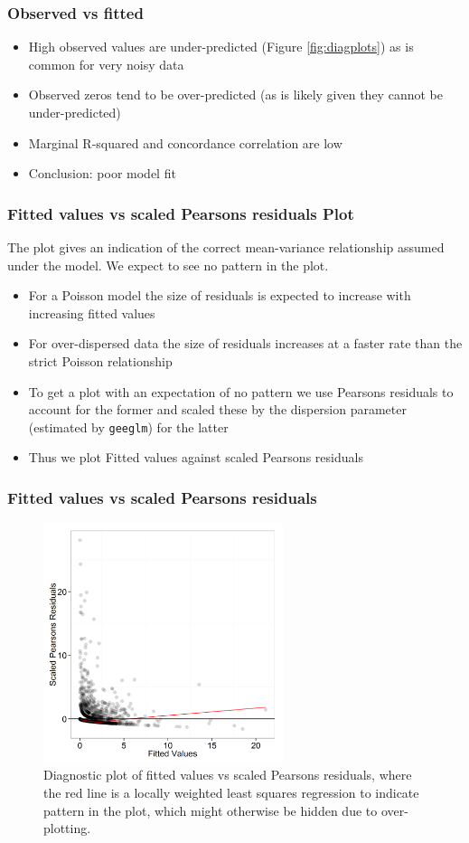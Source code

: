 \begin{frame}
\frametitle{Observed vs fitted}
\begin{itemize}
\item High observed values are under-predicted (Figure \ref{fig:diagplots}) as is common for very noisy data
\item Observed zeros tend to be over-predicted (as is likely given they cannot be under-predicted)
\item Marginal R-squared and concordance correlation are low
\pause
\bigskip
\item Conclusion: poor model fit
\end{itemize}
\end{frame}


\begin{frame}[fragile]
\frametitle{Fitted values vs scaled Pearsons residuals Plot}
The plot gives an indication of the correct mean-variance relationship assumed under the model.  We expect to see no pattern in the plot.  

\begin{itemize}
\item For a Poisson model the size of residuals is expected to increase with increasing fitted values
\item For over-dispersed data the size of residuals increases at a faster rate than the strict Poisson relationship
\item To get a plot with an expectation of no pattern we use Pearsons residuals to account for the former and scaled these by the dispersion parameter (estimated by {\tt geeglm}) for the latter
\item Thus we plot Fitted values against scaled Pearsons residuals
\end{itemize}
\end{frame}

\begin{frame}[fragile]
\frametitle{Fitted values vs scaled Pearsons residuals}
\begin{figure}[h]
  \centering
    \includegraphics[width=7cm]{danish/FitPlots_resids.png}
  \caption{Diagnostic plot of fitted values vs scaled Pearsons residuals, where the red line is a locally weighted least squares regression to indicate pattern in the plot, which might otherwise be hidden due to over-plotting.}
  \label{fig:diagplots2}
\end{figure}
\end{frame}

